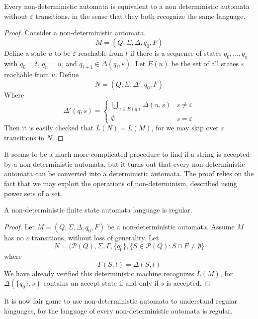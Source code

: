 \begin{lemma}
    Every non-deterministic automata is equivalent to a non deterministic automata without $\varepsilon$ transitions, in the sense that they both recognize the same language.
\end{lemma}
\begin{proof}
    Consider a non-deterministic automata.
    \[ M = (Q, \Sigma, \Delta, q_0, F) \]
    Define a state $u$ to be $\varepsilon$ reachable from $t$ if there is a sequence of states $q_0, \dots, q_n$ with $q_0 = t$, $q_n = u$, and $q_{i + 1} \in \Delta(q_i, \varepsilon)$. Let $E(u)$ be the set of all states $\varepsilon$ reachable from $u$. Define
    \[ N = (Q, \Sigma, \Delta', q_0, F) \]
    Where
    \[ \Delta'(q, s) = \begin{cases} \bigcup_{u \in E(q)} \Delta(u, s) & s \neq \varepsilon \\ \emptyset & s = \varepsilon \end{cases} \]
    Then it is easily checked that $L(N) = L(M)$, for we may skip over $\varepsilon$ transitions in $N$.
\end{proof}

It seems to be a much more complicated procedure to find if a string is accepted by a non-deterministic automata, but it turns out that every non-deterministic automata can be converted into a deterministic automata. The proof relies on the fact that we may exploit the operations of non-determinism, described using power sets of a set.

\begin{theorem}
    A non-deterministic finite state automata language is regular.
\end{theorem}
\begin{proof}
    Let $M = (Q, \Sigma, \Delta, q_0, F)$ be a non-deterministic automata. Assume $M$ has no $\varepsilon$ transitions, without loss of generality. Let
    \[ N = (\mathcal{P}(Q), \Sigma, \Gamma, \{ q_0 \}, \{ S \in \mathcal{P}(Q) : S \cap F \neq \emptyset \} \]
    where
    \[ \Gamma(S, t) = \Delta(S, t) \]
    We have already verified this deterministic machine recognizes $L(M)$, for $\Delta(\{ q_0 \}, s)$ contains an accept state if and only if $s$ is accepted.
\end{proof}

It is now fair game to use non-deterministic automata to understand regular languages, for the language of every non-deterministic automata is regular.

